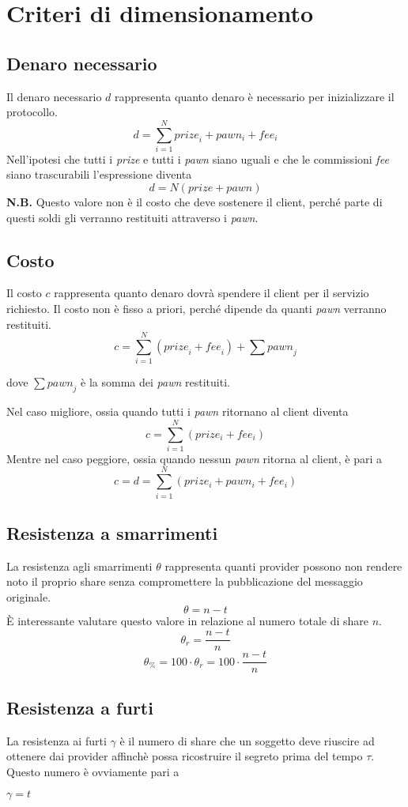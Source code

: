 \section{Criteri di dimensionamento}

\subsection{Denaro necessario}
Il denaro necessario $ d $ rappresenta quanto denaro è necessario per inizializzare
il protocollo.
$$ d = \sum_{i=1}^{N} \textit{prize}_i + pawn_i + fee_i $$
Nell'ipotesi che tutti i \textit{prize} e tutti i \textit{pawn}
siano uguali e che le commissioni \textit{fee} siano trascurabili
l'espressione diventa
$$ d = N(prize + pawn) $$
\textbf{N.B.} Questo valore non è il costo che deve sostenere il client, perché parte
di questi soldi gli verranno restituiti attraverso i \textit{pawn}.

\subsection{Costo}
Il costo $ c $ rappresenta quanto denaro dovrà spendere il client per il servizio
richiesto. Il costo non è fisso a priori,
perché dipende da quanti \textit{pawn} verranno
restituiti.
$$ c = \sum_{i=1}^{N} (\textit{prize}_i + \textit{fee}_i) + \sum \textit{pawn}_j $$
\begin{flushright}
	dove $ \sum \textit{pawn}_j $ è la somma dei \textit{pawn} restituiti.
\end{flushright}
Nel caso migliore, ossia quando tutti i \textit{pawn} ritornano al client diventa
$$ c = \sum_{i=1}^{N} (prize_i + fee_i) $$
Mentre nel caso peggiore, ossia quando nessun \textit{pawn}
ritorna al client, è pari a
$$ c = d = \sum_{i=1}^{N} (prize_i + pawn_i + fee_i) $$


\subsection{Resistenza a smarrimenti}
La resistenza agli smarrimenti $ \theta $ rappresenta quanti provider possono non
rendere noto il proprio share senza compromettere la pubblicazione del messaggio
originale.
$$ \theta = n - t $$
È interessante valutare questo valore in relazione
al numero totale di share $ n $.
$$ \theta_r = \frac{n - t}{n} $$
$$ \theta_\% = 100 \cdot \theta_r = 100 \cdot \frac{n - t}{n} $$

\subsection{Resistenza a furti}
La resistenza ai furti $ \gamma $ è il numero di share che un soggetto deve riuscire
ad ottenere dai provider affinchè possa
ricostruire il segreto prima del tempo $ \tau $.
Questo numero è ovviamente pari a
\begin{center}
	$ \gamma = t $
\end{center}








